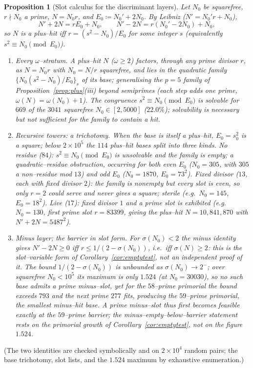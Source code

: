 \documentclass[11pt]{article}
\newtheorem{proposition}[theorem]{Proposition}
\theoremstyle{definition}
\begin{document}
\begin{proposition}[Slot calculus for the discriminant layers]\label{prop:slot}
Let $N_0$ be squarefree, $r\nmid N_0$ a prime, $N=N_0r$, and $E_0\coloneqq N_0'+2N_0$. By Leibniz
($N'=N_0'r+N_0$),
\[ N'+2N=rE_0+N_0,\qquad N'-2N=r(N_0'-2N_0)+N_0, \]
so $N$ is a plus--hit iff $r=(s^2-N_0)/E_0$ for some integer $s$ (equivalently $s^2\equiv N_0\pmod{E_0}$).
\begin{enumerate}[label=\textup{(\alph*)},leftmargin=2.2em]
\item \emph{Every $\omega$--stratum.} A plus--hit $N$ ($\omega\ge2$) factors, through any prime divisor
$r$, as $N=N_0r$ with $N_0=N/r$ squarefree, and lies in the quadratic family
$\{N_0(s^2-N_0)/E_0\}_s$ of its base; generalising the $p=5$ family of
Proposition~\ref{prop:plus}(iii) beyond semiprimes (each step adds one prime,
$\omega(N)=\omega(N_0)+1$). The congruence $s^2\equiv N_0\pmod{E_0}$ is solvable for $669$ of the
$3041$ squarefree $N_0\in[2,5000]$ ($22.0\%$); solvability is necessary but not sufficient for the
family to contain a hit.
\item \emph{Recursive towers: a trichotomy.} When the base is itself a plus--hit, $E_0=s_0^2$ is a
square; below $2\times10^5$ the $114$ plus--hit bases split into three kinds. \emph{No residue} ($84$):
$s^2\equiv N_0\pmod{E_0}$ is unsolvable and the family is empty; a quadratic--residue obstruction,
occurring for both even $E_0$ ($N_0=305$, with $305$ a non--residue mod $13$) and odd $E_0$
($N_0=1870$, $E_0=73^2$). \emph{Fixed divisor} ($13$, each with fixed divisor $2$): the family is
nonempty but every slot is even, so only $r=2$ could serve and never gives a square; sterile (e.g.\
$N_0=145$, $E_0=18^2$). \emph{Live} ($17$): fixed divisor $1$ and a prime slot is exhibited (e.g.\
$N_0=130$, first prime slot $r=83399$, giving the plus--hit $N=10{,}841{,}870$ with $N'+2N=5487^2$).
\item \emph{Minus layer; the barrier in slot form.} For $\sigma(N_0)<2$ the minus identity gives
$N'-2N\ge0$ iff $r\le1/(2-\sigma(N_0))$, i.e.\ iff $\sigma(N)\ge2$: this is the slot--variable form of
Corollary~\ref{cor:emptytest}, not an independent proof of it. The bound $1/(2-\sigma(N_0))$ is
unbounded as $\sigma(N_0)\to2^-$; over squarefree $N_0<10^5$ its maximum is only $1.524$ (at
$N_0=30030$), so no such base admits a prime minus--slot, yet for the $58$--prime primorial the bound
exceeds $793$ and the next prime $277$ fits, producing the $59$--prime primorial, the smallest
minus--hit base. A prime minus--slot thus first becomes feasible \emph{exactly} at the $59$--prime
barrier; the minus--empty--below--barrier statement rests on the primorial growth of
Corollary~\ref{cor:emptytest}, not on the figure $1.524$.
\end{enumerate}
\end{proposition}
\noindent (The two identities are checked symbolically and on $2\times10^4$ random pairs; the base
trichotomy, slot lists, and the $1.524$ maximum by exhaustive enumeration.)
\end{document}

